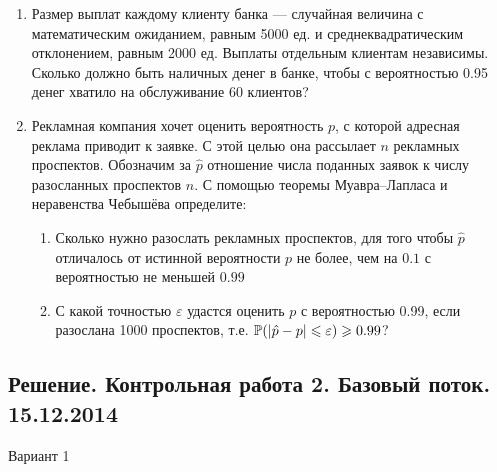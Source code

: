 \documentclass[12pt, a4paper]{article}\usepackage[]{graphicx}\usepackage[]{color}
\begin{document}
\begin{enumerate}
					\item Размер выплат каждому клиенту банка — случайная величина с математическим
					ожиданием, равным 5000 ед. и среднеквадратическим отклонением, равным 2000 ед.
					Выплаты отдельным клиентам независимы. Сколько должно быть наличных денег в банке,
					чтобы с вероятностью 0.95 денег хватило на обслуживание 60 клиентов?

					\item Рекламная компания хочет оценить вероятность $p$, с которой адресная реклама приводит к
					заявке. С этой целью она  рассылает $n$ рекламных проспектов. Обозначим за $\hat p$ отношение
					числа поданных заявок к числу разосланных проспектов $n$. С помощью теоремы Муавра–Лапласа и неравенства Чебышёва определите:
					\begin{enumerate}
						\item  Сколько нужно разослать рекламных проспектов, для того чтобы $\hat p$ отличалось от
						истинной вероятности $p$ не более, чем на $0.1$ с вероятностью не меньшей $0.99$
						\item С какой точностью $\varepsilon$ удастся оценить $p$ с вероятностью 0.99, если разослана 1000
						проспектов, т.е. $\P(|\hat p - p|\leq \varepsilon)\geq 0.99$?
					\end{enumerate}
				\end{enumerate}





				\subsection{Решение. Контрольная работа 2. Базовый поток. 15.12.2014}

				\begin{center}
					Вариант 1
				\end{center}
\end{document}
